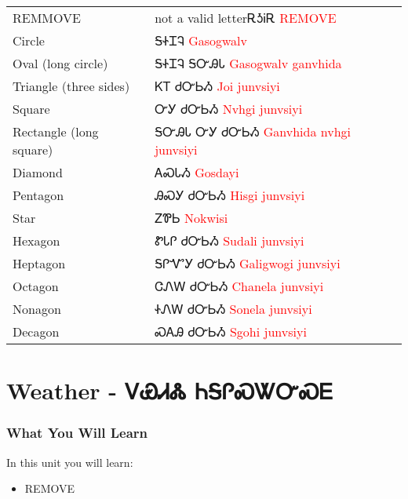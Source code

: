 \begin{minipage}{\linewidth}
\begin{tabular}{p{3cm} p{11cm}}
REMMOVE & not a valid letterᎡᎼᎥᎡ 
 \newline \textcolor{red}{REMOVE}\\
Circle & ᎦᏐᏆᎸ 
 \newline \textcolor{red}{Gasogwalv}\\
Oval (long circle) & ᎦᏐᏆᎸ ᎦᏅᎯᏓ 
 \newline \textcolor{red}{Gasogwalv ganvhida}\\
Triangle (three sides) & ᏦᎢ ᏧᏅᏏᏱ 
 \newline \textcolor{red}{Joi junvsiyi}\\
Square & ᏅᎩ ᏧᏅᏏᏱ 
 \newline \textcolor{red}{Nvhgi junvsiyi}\\
Rectangle (long square) & ᎦᏅᎯᏓ ᏅᎩ ᏧᏅᏏᏱ 
 \newline \textcolor{red}{Ganvhida nvhgi junvsiyi}\\
Diamond & ᎪᏍᏓᏱ 
 \newline \textcolor{red}{Gosdayi}\\
Pentagon & ᎯᏍᎩ ᏧᏅᏏᏱ 
 \newline \textcolor{red}{Hisgi junvsiyi}\\
Star & ᏃᏈᏏ 
 \newline \textcolor{red}{Nokwisi}\\
Hexagon & ᏑᏓᎵ ᏧᏅᏏᏱ 
 \newline \textcolor{red}{Sudali junvsiyi}\\
Heptagon & ᎦᎵᏉᎩ ᏧᏅᏏᏱ 
 \newline \textcolor{red}{Galigwogi junvsiyi}\\
Octagon & ᏣᏁᎳ ᏧᏅᏏᏱ 
 \newline \textcolor{red}{Chanela junvsiyi}\\
Nonagon & ᏐᏁᎳ ᏧᏅᏏᏱ 
 \newline \textcolor{red}{Sonela junvsiyi}\\
Decagon & ᏍᎪᎯ ᏧᏅᏏᏱ 
 \newline \textcolor{red}{Sgohi junvsiyi}\\
\end{tabular}
\end{minipage}

\chapter{Weather - ᏙᏯᏗᏜ ᏂᎦᎵᏍᏔᏅᏍᎬ}
\subsection{What You Will Learn}
In this unit you will learn:
\begin{itemize}
\item REMOVE
\end{itemize}\newpage

